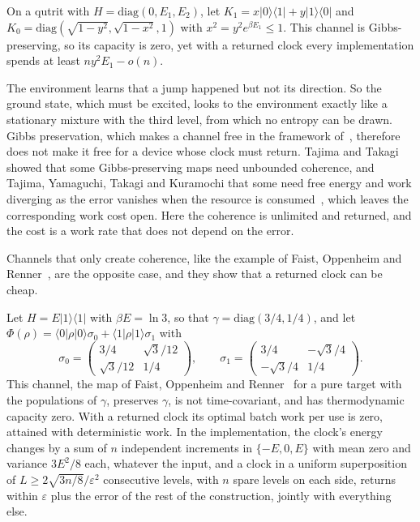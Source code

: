 \begin{proposition}\label{kt:prop:gpqutrit}
On a qutrit with $H=\mathrm{diag}(0,E_1,E_2)$, let $K_1=x|0\rangle\langle1|+y|1\rangle\langle0|$ and $K_0=\mathrm{diag}(\sqrt{1-y^2},\sqrt{1-x^2},1)$ with $x^2=y^2e^{\beta E_1}\le1$. This channel is Gibbs-preserving, so its capacity is zero, yet with a returned clock every implementation spends at least $ny^2E_1-o(n)$.
\end{proposition}

The environment learns that a jump happened but not its direction. So the ground state, which must be excited, looks to the environment exactly like a stationary mixture with the third level, from which no entropy can be drawn. Gibbs preservation, which makes a channel free in the framework of~\cite{FBB21}, therefore does not make it free for a device whose clock must return. Tajima and Takagi showed that some Gibbs-preserving maps need unbounded coherence, and Tajima, Yamaguchi, Takagi and Kuramochi that some need free energy and work diverging as the error vanishes when the resource is consumed~\cite{TajimaTakagi25,TYTK25}, which leaves the corresponding work cost open. Here the coherence is unlimited and returned, and the cost is a work rate that does not depend on the error.

Channels that only create coherence, like the example of Faist, Oppenheim and Renner~\cite{FOR15}, are the opposite case, and they show that a returned clock can be cheap.

\begin{proposition}\label{kt:prop:reach}
Let $H=E|1\rangle\langle1|$ with $\beta E=\ln3$, so that $\gamma=\mathrm{diag}(3/4,1/4)$, and let $\Phi(\rho)=\langle0|\rho|0\rangle\sigma_0+\langle1|\rho|1\rangle\sigma_1$ with
\[
\sigma_0=\begin{pmatrix}3/4&\sqrt3/12\\ \sqrt3/12&1/4\end{pmatrix},\qquad \sigma_1=\begin{pmatrix}3/4&-\sqrt3/4\\ -\sqrt3/4&1/4\end{pmatrix}.
\]
This channel, the map of Faist, Oppenheim and Renner~\cite{FOR15} for a pure target with the populations of $\gamma$, preserves $\gamma$, is not time-covariant, and has thermodynamic capacity zero. With a returned clock its optimal batch work per use is zero, attained with deterministic work. In the implementation, the clock's energy changes by a sum of $n$ independent increments in $\{-E,0,E\}$ with mean zero and variance $3E^2/8$ each, whatever the input, and a clock in a uniform superposition of $L\ge2\sqrt{3n/8}/\varepsilon^2$ consecutive levels, with $n$ spare levels on each side, returns within $\varepsilon$ plus the error of the rest of the construction, jointly with everything else.
\end{proposition}

